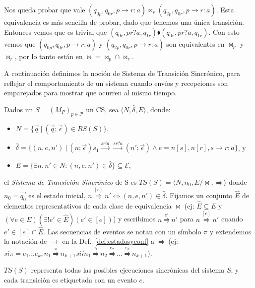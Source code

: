 \begin{ejemplo}
Nos queda probar que vale $(q_{0p}, q_{0r}, p \rightarrow r:a) \bowtie_r (q_{2p}, q_{0r}, p \rightarrow r:a)$. Esta equivalencia es más sencilla de probar, dado que tenemos una única transición. Entonces vemos que es trivial que $(q_{0r}, pr?a, q_{1r}) \underline{\blacklozenge} (q_{0r}, pr?a, q_{1r})$. Con esto vemos que $(q_{0p}, q_{0r}, p \rightarrow r:a)$ y $(q_{2p}, q_{0r}, p \rightarrow r:a)$ son equivalentes en $\bowtie_p$ y $\bowtie_r$, por lo tanto están en $\bowtie = \bowtie_p \cap \bowtie_r$.
\end{ejemplo} 

A continuación definimos la noción de Sistema de Transición Sincrónico, para reflejar el comportamiento de un sistema cuando envíos y recepciones son emparejados para mostrar que ocurren al mismo tiempo.

\begin{definition} Dados un $S = (M_P)_{p \in \mathcal{P}}$ un CS, sea $\langle N,\hat{\delta}, E \rangle$, donde: 
\begin{itemize}
    \item[] $N = \{\overrightarrow{q} \ | \ (\overrightarrow{q}; \overrightarrow{\epsilon}) \in RS(S) \}$,
    \item[] $\hat{\delta}= \{(n, e, n') \ | \ (n;\overrightarrow{\epsilon}) s_1 \overset{sr!a}{\longrightarrow}\overset{sr?a}{\longrightarrow} (n';\overrightarrow{\epsilon})	\land e= n[s], n[r], s \rightarrow r:a \}$, y
    \item[] $ E = \{ \exists n, n' \in N : (n,e,n') \in \hat{\delta}\} \subseteq \mathcal{E}$,
\end{itemize}
   el \emph{Sistema de Transición Sincrónico} de S es $TS(S)= \langle N, n_0, E/ \bowtie,\rightrightharpoons \rangle$ donde $n_0= \overrightarrow{q_0} $ es el estado inicial, $n \overset{[e]}{\rightrightharpoons} n' \iff (n,e,n') \in \hat{\delta}$. Fijamos un conjunto $\hat{E}$ de elementos representativos de cada clase de equivalencia $\bowtie$ (ej: $\hat{E} \subseteq E$ y $\left(\forall e \in E\right)\left(\exists!e' \in \hat{E}\right)\left(e' \in [e] \right)$) y escribimos $n \overset{e'}{\rightrightharpoons} n'$ para $ n \overset{[e]}{\rightrightharpoons} n'$ cuando $ e' \in [e] \cap \hat{E} $. Las secuencias de eventos se notan con un símbolo $\pi$ y extendemos la notación de $ \rightarrow$ en la Def.~\ref{def:estadosyconf} a $\rightrightharpoons$ (ej: $si \pi = e_1 ...e_k, n_1 \overset{\pi}{\rightrightharpoons}n_{k+1} sii n_1 \overset{e_1}{\rightrightharpoons} n_2 \overset{e_2}{\rightrightharpoons}...\overset{e_k}{\rightrightharpoons} n_{k+1}$).

$TS(S)$ representa todas las posibles ejecuciones sincrónicas del sistema $S$; y cada transición es etiquetada con un evento $e$.
\end{definition}


